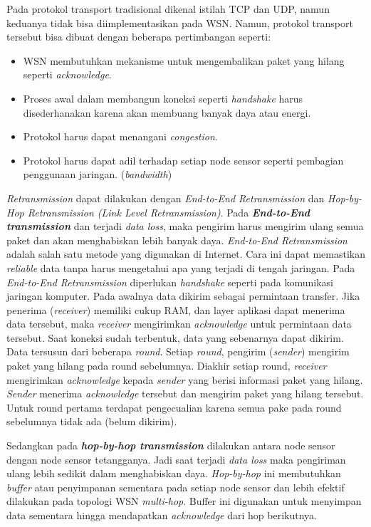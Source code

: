 \documentclass[a4paper,twoside]{article}
\begin{document}
\begin{enumerate}
Pada protokol transport tradisional dikenal istilah TCP dan UDP, namun keduanya tidak bisa diimplementasikan pada WSN. Namun, protokol transport tersebut bisa dibuat dengan beberapa pertimbangan seperti:
\begin{itemize}
	\item WSN membutuhkan mekanisme untuk mengembalikan paket yang hilang seperti \textit{acknowledge}.
	\item Proses awal dalam membangun koneksi seperti \textit{handshake} harus disederhanakan karena akan membuang banyak daya atau energi.
	\item Protokol harus dapat menangani \textit{congestion}.
	\item Protokol harus dapat adil terhadap setiap node sensor seperti pembagian penggunaan jaringan. (\textit{bandwidth})
\end{itemize} 

\textit{Retransmission} dapat dilakukan dengan \textit{End-to-End Retransmission} dan \textit{Hop-by-Hop Retransmission (Link Level Retransmission)}. Pada \textbf{\textit{End-to-End transmission}} dan terjadi \textit{data loss}, maka pengirim harus mengirim ulang semua paket dan akan menghabiskan lebih banyak daya. \textit{End-to-End Retransmission} adalah salah satu metode yang digunakan di Internet. Cara ini dapat memastikan \textit{reliable} data tanpa harus mengetahui apa yang terjadi di tengah jaringan. Pada \textit{End-to-End Retransmission} diperlukan \textit{handshake} seperti pada komunikasi jaringan komputer. Pada awalnya data dikirim sebagai permintaan transfer. Jika penerima (\textit{receiver}) memiliki cukup RAM, dan layer aplikasi dapat menerima data tersebut, maka \textit{receiver} mengirimkan \textit{acknowledge} untuk permintaan data tersebut. Saat koneksi sudah terbentuk, data yang sebenarnya dapat dikirim. Data tersusun dari beberapa \textit{round}. Setiap \textit{round}, pengirim (\textit{sender}) mengirim paket yang hilang pada round sebelumnya. Diakhir setiap  round, \textit{receiver} mengirimkan \textit{acknowledge} kepada \textit{sender} yang berisi informasi paket yang hilang. \textit{Sender} menerima \textit{acknowledge} tersebut dan mengirim paket yang hilang tersebut. Untuk round pertama terdapat pengecualian karena semua pake pada round sebelumnya tidak ada (belum dikirim). 

Sedangkan pada \textbf{\textit{hop-by-hop transmission}} dilakukan antara node sensor dengan node sensor tetangganya. Jadi saat terjadi \textit{data loss} maka pengiriman ulang lebih sedikit dalam menghabiskan daya. \textit{Hop-by-hop} ini membutuhkan \textit{buffer} atau penyimpanan sementara pada setiap node sensor dan lebih efektif dilakukan pada topologi WSN \textit{multi-hop}. Buffer ini digunakan untuk menyimpan data sementara hingga mendapatkan \textit{acknowledge} dari hop berikutnya.


\end{enumerate}
\end{document}
